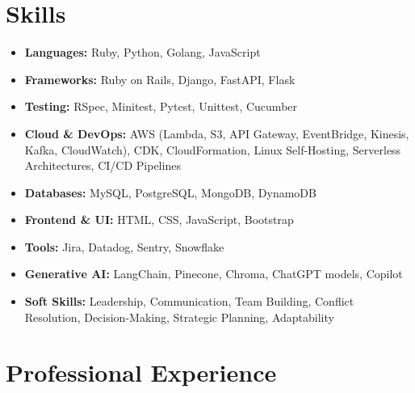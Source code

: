 \documentclass[a4paper,10pt]{article}
\begin{document}
\section*{Skills}
\sectionline
\vspace{-1em}
\begin{itemize}[leftmargin=0.5cm]
	\item \textbf{Languages:} Ruby, Python, Golang, JavaScript
	\item \textbf{Frameworks:} Ruby on Rails, Django, FastAPI, Flask
	\item \textbf{Testing:} RSpec, Minitest, Pytest, Unittest, Cucumber
	\item \textbf{Cloud \& DevOps:} AWS (Lambda, S3, API Gateway, EventBridge,
	      Kinesis, Kafka, CloudWatch), CDK, CloudFormation, Linux Self-Hosting,
	      Serverless Architectures, CI/CD Pipelines
	\item \textbf{Databases:} MySQL, PostgreSQL, MongoDB, DynamoDB
	\item \textbf{Frontend \& UI:} HTML, CSS, JavaScript, Bootstrap
	\item \textbf{Tools:} Jira, Datadog, Sentry, Snowflake
	\item \textbf{Generative AI:} LangChain, Pinecone, Chroma, ChatGPT models,
	      Copilot
	\item \textbf{Soft Skills:} Leadership, Communication, Team Building,
	      Conflict Resolution, Decision-Making, Strategic Planning, Adaptability
\end{itemize}

\section*{Professional Experience}
\sectionline
\vspace{-1em}
\end{document}
